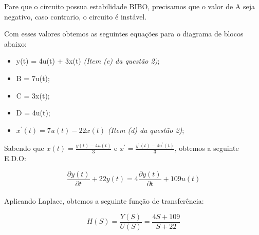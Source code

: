 \documentclass[a4paper, 12pt]{article}
\begin{document}
	Pare que o circuito possua estabilidade BIBO, precisamos que o valor de A seja negativo, caso contrario, o circuito é instável.
	
	Com esses valores obtemos as seguintes equações para o diagrama de blocos abaixo:
	
		\begin{itemize}
			\item y(t) = 4u(t) + 3x(t) \textit{(Item (e) da questão 2)};
			\item B = 7u(t);
			\item C = 3x(t);
			\item D = 4u(t);
			\item $x^{'}(t) = 7u(t) - 22x(t)$ \textit{(Item (d) da questão 2)};
		\end{itemize}	
		
	Sabendo que $x(t) = \frac{y(t) - 4u(t)}{3}$ e  $x^{'} = \frac{y^{'}(t) - 4u^{'}(t)}{3}$, obtemos a seguinte E.D.O:
	
	\[
	\frac{\partial y(t)}{\partial t} + 22y(t) = 4\frac{\partial y(t)}{\partial t} + 109u(t)
	\] 	\\	
	
	Aplicando Laplace, obtemos a seguinte função de transferência:
	
	\[
	H(S) = \frac{Y(S)}{U(S)} = \frac{4S + 109}{S +22}
	\] 	\\		
\end{document}
